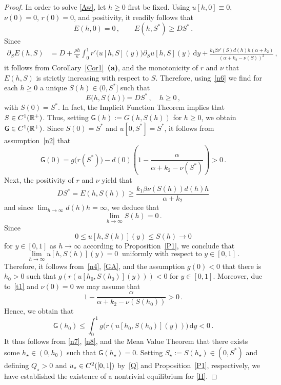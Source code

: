 \documentclass[10pt,a4paper]{amsart}
\newcommand{\R}{\mathbb{R}}
\newcommand{\rd}{\mathrm{d}}
\begin{document}
\begin{proof}
In order to solve \eqref{Aw}, let $h\ge 0$ first be fixed. Using $u[h,0]\equiv 0$, $\nu(0)=0$, $r(0)=0$, and positivity, it readily follows that
\begin{equation}\label{n6}
E(h,0)=0\,,\qquad E(h,S^*)\ge  DS^*\,.
\end{equation}
Since 
\begin{align*}
\partial_SE(h,S)&=D+\frac{\rho h}{\kappa} \int_0^1  r'\bigl(u[h,S](y)\bigr) \partial_Su[h,S](y)\,\rd y+\frac{k_1\beta \nu'(S) d(h)h(\alpha+k_2)}{(\alpha+k_2-\nu(S))^2}\,,
\end{align*}
it follows from Corollary~\ref{Cor1}~{\bf (a)}, and the monotonicity of $r$ and $\nu$ that $E(h,S)$ is strictly increasing with respect to $S$. Therefore, using~\eqref{n6} we find for each $h\ge 0$  a unique $S(h)\in (0,S^*]$ such that
\begin{equation}\label{E}
E\big(h,S(h)\big)=DS^*\,,\quad h\ge 0\,,
\end{equation}
with $S(0)=S^*$. In fact, the Implicit Function Theorem implies that 
$S\in {\rm C}^1(\R^+)$. Thus, setting $\mathsf{G}(h):=G(h,S(h))$ for $h\ge 0$, we obtain $\mathsf{G}\in {\rm C}^1(\R^+)$. Since $S(0)=S^*$ and $u[0,S^*]=S^*$, it follows from assumption~\eqref{n2} that
\begin{equation}\label{n7}
\mathsf{G}(0)=  g\big(r(S^*)\big)-d(0)\left(1-\frac{\alpha}{\alpha+k_2-\nu(S^*)}\right)>0\,.
\end{equation}
Next, the positivity of $r$ and $\nu$ yield that
$$
DS^*=E(h,S(h))\ge  \frac{k_1\beta \nu(S(h)) d(h)h}{\alpha+k_2}
$$
and since $\lim_{h\to\infty} d(h)h=\infty$, we deduce that 
\begin{equation}\label{t1}
\lim_{h\to\infty} S(h)=0\,.
\end{equation} 
Since 
$$
0\le u[h,S(h)](y)\le S(h) \rightarrow 0 
$$
for $y\in [0,1]$ as  $h\rightarrow \infty$
according to Proposition~\ref{P1}, we  conclude that
\begin{equation}\label{n4}
\lim_{h\to\infty} u[h,S(h)](y)=0\ \text{ uniformly with respect to $y\in [0,1]$}\,.
\end{equation}
 Therefore, it follows from~\eqref{n4}, \eqref{GA}, and the assumption $g(0)<0$ that there is $h_0>0$ such that $g(r(u[h_0,S(h_0)](y)))<0$ for $y\in [0,1]$. Moreover, due to~\eqref{t1} and $\nu(0)=0$ we may assume that
$$
1-\frac{\alpha}{\alpha+k_2-\nu(S(h_0))}>0\,.
$$
Hence, we obtain that
\begin{equation}\label{n8}
\mathsf{G}(h_0)\le \int_0^{1} g\big(r(u[h_0,S(h_0)](y))\big)\,\rd y <0\,.
\end{equation}
It thus follows from \eqref{n7}, \eqref{n8}, and the Mean Value Theorem that there exists some $h_\star\in (0,h_0)$ such that $\mathsf{G}(h_\star)=0$. Setting $S_\star:=S(h_\star)\in (0,S^*)$ and defining $Q_\star>0$  and $u_\star\in {\rm C}^2([0,1])$ by~\eqref{Q} and Proposition~\ref{P1}, respectively, we have established the existence of a nontrivial equilibrium for \eqref{H}.
\end{proof}
\end{document}
